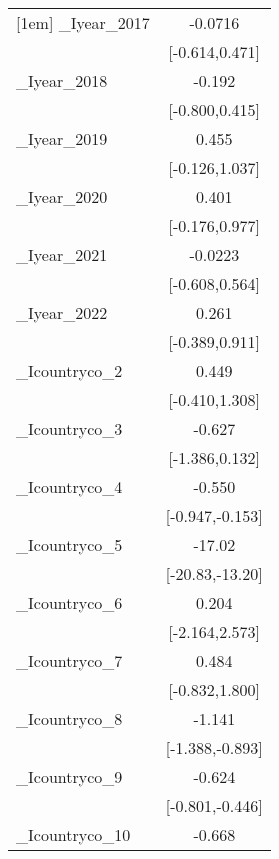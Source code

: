 {\begin{tabular}{l*{1}{c}}
[1em]
\_Iyear\_2017 &               -0.0716         \\
            &        [-0.614,0.471]         \\
[1em]
\_Iyear\_2018 &                -0.192         \\
            &        [-0.800,0.415]         \\
[1em]
\_Iyear\_2019 &                 0.455         \\
            &        [-0.126,1.037]         \\
[1em]
\_Iyear\_2020 &                 0.401         \\
            &        [-0.176,0.977]         \\
[1em]
\_Iyear\_2021 &               -0.0223         \\
            &        [-0.608,0.564]         \\
[1em]
\_Iyear\_2022 &                 0.261         \\
            &        [-0.389,0.911]         \\
[1em]
\_Icountryco\_2&                 0.449         \\
            &        [-0.410,1.308]         \\
[1em]
\_Icountryco\_3&                -0.627         \\
            &        [-1.386,0.132]         \\
[1em]
\_Icountryco\_4&                -0.550\sym{**} \\
            &       [-0.947,-0.153]         \\
[1em]
\_Icountryco\_5&                -17.02\sym{***}\\
            &       [-20.83,-13.20]         \\
[1em]
\_Icountryco\_6&                 0.204         \\
            &        [-2.164,2.573]         \\
[1em]
\_Icountryco\_7&                 0.484         \\
            &        [-0.832,1.800]         \\
[1em]
\_Icountryco\_8&                -1.141\sym{***}\\
            &       [-1.388,-0.893]         \\
[1em]
\_Icountryco\_9&                -0.624\sym{***}\\
            &       [-0.801,-0.446]         \\
[1em]
\_Icountryco\_10&                -0.668         \\

\end{tabular}}
